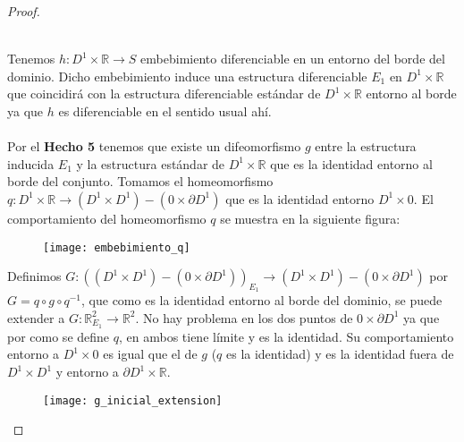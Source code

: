 \begin{proof}
\begin{enumerate}
			\\ Tenemos $h: D^1\times \mathbb{R} \rightarrow S$ embebimiento diferenciable en un entorno del borde del dominio. Dicho embebimiento induce una estructura diferenciable $E_1$ en $D^1\times \mathbb{R}$ que coincidirá con la estructura diferenciable estándar de $D^1\times \mathbb{R}$ entorno al borde ya que $h$ es diferenciable en el sentido usual ahí.\\
			\\ Por el \textbf{Hecho 5} tenemos que existe un difeomorfismo $g$ entre la estructura inducida $E_1$ y la estructura estándar de $D^1\times \mathbb{R}$ que es la identidad entorno al borde del conjunto. Tomamos el homeomorfismo $q: D^1\times \mathbb{R} \rightarrow (D^1\times D^1) - (0 \times \partial D^1)$ que es la identidad entorno $D^1\times 0$. El comportamiento del homeomorfismo $q$ se muestra en la siguiente figura:\\
			
			\begin{figure}[h]
  				\centering
  				\texttt{[image: embebimiento\_q]}
  				\label{fig:embebimiento_q}
			\end{figure}
			
			Definimos $G:  ((D^1\times D^1) - (0 \times \partial D^1))_{E_1} \rightarrow (D^1\times D^1) - (0 \times \partial D^1)$ por $G = q \circ g \circ q^{-1}$, que como es la identidad entorno al borde del dominio, se puede extender a $G:\mathbb{R}^2_{E_1} \rightarrow \mathbb{R}^2$. No hay problema en los dos puntos de $0 \times \partial D^1$ ya que por como se define $q$, en ambos tiene límite y es la identidad. Su comportamiento entorno a $D^1 \times 0$ es igual que el de $g$ ($q$ es la identidad) y es la identidad fuera de $D^1 \times D^1$ y entorno a $\partial D^1 \times \mathbb{R}$.\\
			
			\begin{figure}[h]
  				\centering
  				\texttt{[image: g\_inicial\_extension]}
  				\label{fig:g_inicial_extension}
			\end{figure}
			

\end{enumerate}
\end{proof}
